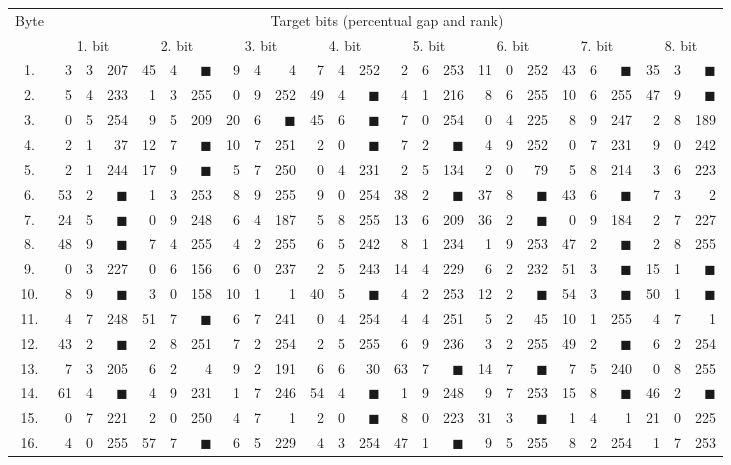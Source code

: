 \begin{tabular}{| c | r@{.} l@{\quad}r | r@{.} l@{\quad}r | r@{.} l@{\quad}r | r@{.} l@{\quad}r | r@{.} l@{\quad}r | r@{.} l@{\quad}r | r@{.} l@{\quad}r | r@{.} l@{\quad}r |}
	\hline
	\multirow{2}{*}{Byte} & \multicolumn{24}{c|}{Target bits (percentual gap and rank)} \\
	\cline{2-25}
	~ & \multicolumn{3}{c|}{1. bit} & \multicolumn{3}{c|}{2. bit} & \multicolumn{3}{c|}{3. bit} & \multicolumn{3}{c|}{4. bit} & \multicolumn{3}{c|}{5. bit} & \multicolumn{3}{c|}{6. bit} & \multicolumn{3}{c|}{7. bit} & \multicolumn{3}{c|}{8. bit} \\
	\hline
	\hline
	1.&3&3&207&45&4&{$\blacksquare$}&9&4&4&7&4&252&2&6&253&11&0&252&43&6&{$\blacksquare$}&35&3&{$\blacksquare$}\\
	\hline
	2.&5&4&233&1&3&255&0&9&252&49&4&{$\blacksquare$}&4&1&216&8&6&255&10&6&255&47&9&{$\blacksquare$}\\
	\hline
	3.&0&5&254&9&5&209&20&6&{$\blacksquare$}&45&6&{$\blacksquare$}&7&0&254&0&4&225&8&9&247&2&8&189\\
	\hline
	4.&2&1&37&12&7&{$\blacksquare$}&10&7&251&2&0&{\weak$\blacksquare$}&7&2&{\weak$\blacksquare$}&4&9&252&0&7&231&9&0&242\\
	\hline
	5.&2&1&244&17&9&{$\blacksquare$}&5&7&250&0&4&231&2&5&134&2&0&79&5&8&214&3&6&223\\
	\hline
	6.&53&2&{$\blacksquare$}&1&3&253&8&9&255&9&0&254&38&2&{$\blacksquare$}&37&8&{$\blacksquare$}&43&6&{$\blacksquare$}&7&3&2\\
	\hline
	7.&24&5&{$\blacksquare$}&0&9&248&6&4&187&5&8&255&13&6&209&36&2&{$\blacksquare$}&0&9&184&2&7&227\\
	\hline
	8.&48&9&{$\blacksquare$}&7&4&255&4&2&255&6&5&242&8&1&234&1&9&253&47&2&{$\blacksquare$}&2&8&255\\
	\hline
	9.&0&3&227&0&6&156&6&0&237&2&5&243&14&4&229&6&2&232&51&3&{$\blacksquare$}&15&1&{$\blacksquare$}\\
	\hline
	10.&8&9&{\weak$\blacksquare$}&3&0&158&10&1&1&40&5&{$\blacksquare$}&4&2&253&12&2&{$\blacksquare$}&54&3&{$\blacksquare$}&50&1&{$\blacksquare$}\\
	\hline
	11.&4&7&248&51&7&{$\blacksquare$}&6&7&241&0&4&254&4&4&251&5&2&45&10&1&255&4&7&1\\
	\hline
	12.&43&2&{$\blacksquare$}&2&8&251&7&2&254&2&5&255&6&9&236&3&2&255&49&2&{$\blacksquare$}&6&2&254\\
	\hline
	13.&7&3&205&6&2&4&9&2&191&6&6&30&63&7&{$\blacksquare$}&14&7&{$\blacksquare$}&7&5&240&0&8&255\\
	\hline
	14.&61&4&{$\blacksquare$}&4&9&231&1&7&246&54&4&{$\blacksquare$}&1&9&248&9&7&253&15&8&{$\blacksquare$}&46&2&{$\blacksquare$}\\
	\hline
	15.&0&7&221&2&0&250&4&7&1&2&0&{\weak$\blacksquare$}&8&0&223&31&3&{$\blacksquare$}&1&4&1&21&0&225\\
	\hline
	16.&4&0&255&57&7&{$\blacksquare$}&6&5&229&4&3&254&47&1&{$\blacksquare$}&9&5&255&8&2&254&1&7&253\\
	\hline
\end{tabular}